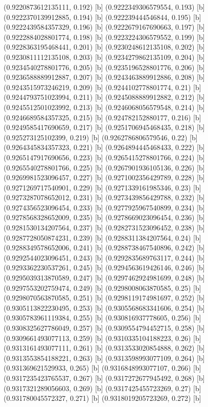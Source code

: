 {{{(0.9220873612135111, 0.192) [b] 
(0.9222349306579554, 0.193) [b] 
(0.9222370139912885, 0.194) [b] 
(0.922239444546844, 0.195) [b] 
(0.9222439584357329, 0.196) [b] 
(0.9222679167690663, 0.197) [b] 
(0.9222884028801774, 0.198) [b] 
(0.9223224306579552, 0.199) [b] 
(0.9228363195468441, 0.201) [b] 
(0.9230248612135108, 0.202) [b] 
(0.9230811112135108, 0.203) [b] 
(0.9234279862135109, 0.204) [b] 
(0.9234540278801776, 0.205) [b] 
(0.9235196528801776, 0.206) [b] 
(0.9236588889912887, 0.207) [b] 
(0.9243463889912886, 0.208) [b] 
(0.9243515973246219, 0.209) [b] 
(0.9244102778801774, 0.21) [b] 
(0.9244793751023994, 0.211) [b] 
(0.9245088889912882, 0.212) [b] 
(0.9245512501023992, 0.213) [b] 
(0.9246068056579548, 0.214) [b] 
(0.9246689584357325, 0.215) [b] 
(0.924782152880177, 0.216) [b] 
(0.9249585417690659, 0.217) [b] 
(0.9251706945468435, 0.218) [b] 
(0.925273125102399, 0.219) [b] 
(0.9262786806579546, 0.22) [b] 
(0.9264345834357323, 0.221) [b] 
(0.9264894445468433, 0.222) [b] 
(0.9265147917690656, 0.223) [b] 
(0.9265415278801766, 0.224) [b] 
(0.9265540278801766, 0.225) [b] 
(0.9267901936105136, 0.226) [b] 
(0.9269981523096457, 0.227) [b] 
(0.9271002356429789, 0.228) [b] 
(0.9271269717540901, 0.229) [b] 
(0.9271339161985346, 0.23) [b] 
(0.9273287078652012, 0.231) [b] 
(0.9273439856429788, 0.232) [b] 
(0.9274356523096454, 0.233) [b] 
(0.9277925967540899, 0.234) [b] 
(0.9278568328652009, 0.235) [b] 
(0.9278669023096454, 0.236) [b] 
(0.9281530134207564, 0.237) [b] 
(0.9282731523096452, 0.238) [b] 
(0.9287728050874231, 0.239) [b] 
(0.9288311384207564, 0.24) [b] 
(0.9288349578652006, 0.241) [b] 
(0.9288738467540896, 0.242) [b] 
(0.9292544023096451, 0.243) [b] 
(0.9292835689763117, 0.244) [b] 
(0.9293362230537261, 0.245) [b] 
(0.9294563619426146, 0.246) [b] 
(0.9295039313870589, 0.247) [b] 
(0.9297462924981699, 0.248) [b] 
(0.9297553202759474, 0.249) [b] 
(0.9298008063870585, 0.25) [b] 
(0.9298070563870585, 0.251) [b] 
(0.9298119174981697, 0.252) [b] 
(0.9305113822230495, 0.253) [b] 
(0.9305568683341606, 0.254) [b] 
(0.9305783961119384, 0.255) [b] 
(0.930816937778605, 0.256) [b] 
(0.9308325627786049, 0.257) [b] 
(0.9309554794452715, 0.258) [b] 
(0.9309661493077113, 0.259) [b] 
(0.9310335104188223, 0.26) [b] 
(0.9313161493077111, 0.261) [b] 
(0.9313533020854888, 0.262) [b] 
(0.9313553854188221, 0.263) [b] 
(0.9313598993077109, 0.264) [b] 
(0.931369621529933, 0.265) [b] 
(0.9316848993077107, 0.266) [b] 
(0.9317235423765537, 0.267) [b] 
(0.9317272677945492, 0.268) [b] 
(0.9317321289056603, 0.269) [b] 
(0.9317425455723269, 0.27) [b] 
(0.931780045572327, 0.271) [b] 
(0.9318019205723269, 0.272) [b] 
}}}
